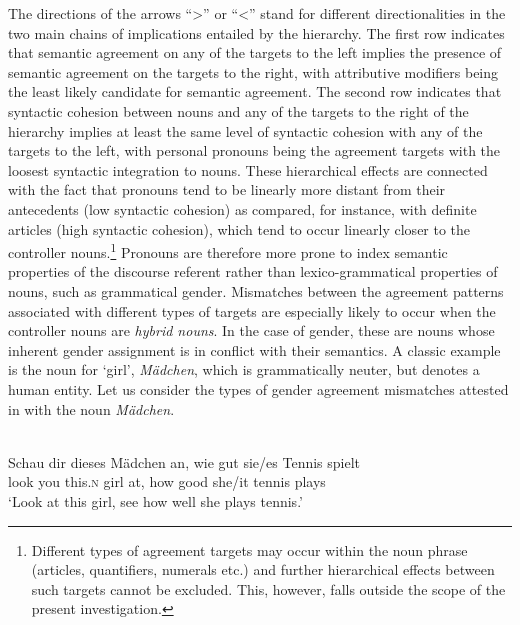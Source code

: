 \documentclass[output=collectionpaper]{langsci/langscibook}
\begin{document}
The directions of the arrows \textendash{} ``{\textgreater}'' or ``{\textless}'' \textendash{} stand for different directionalities in the two main chains of implications entailed by the hierarchy. The first row indicates that semantic agreement on any of the targets to the left implies the presence of semantic agreement on the targets to the right, with attributive modifiers being the least likely candidate for semantic agreement. The second row  indicates that syntactic cohesion between nouns and any of the targets to the right of the hierarchy implies at least the same level of syntactic cohesion with any of the targets to the left, with personal pronouns being the agreement targets with the loosest syntactic integration to nouns.
These hierarchical effects are connected with the fact that pronouns tend to be linearly more distant from their antecedents (low syntactic cohesion) as compared, for instance, with definite articles (high syntactic cohesion), which tend to occur linearly closer to the controller nouns.\footnote{Different types of agreement targets may occur within the noun phrase (articles, quantifiers, numerals etc.\@) and further hierarchical effects between such targets cannot be excluded. This, however, falls outside the scope of the present investigation.} Pronouns are therefore more prone to index semantic properties of the discourse referent rather than lexico-grammatical properties of nouns, such as grammatical gender. Mismatches between the agreement patterns associated with different types of targets are especially likely to occur when the controller nouns are \textit{hybrid nouns}. In the case of gender, these are nouns whose inherent gender assignment is in conflict with their semantics. A classic example is the  noun for `girl', \textit{M\"adchen}, which is grammatically neuter, but denotes a human entity. Let us consider the types of gender agreement mismatches attested in  with the noun \textit{M\"adchen}.


\ea\label{ex:dgm:2:madchen}
\\
\gll Schau dir dieses Mädchen an, wie gut sie/es Tennis spielt \\
     look you this.\textsc{n} girl at, how good she/it tennis plays\\
\glt `Look at this girl, see how well she plays tennis.'\\
\z
\end{document}
